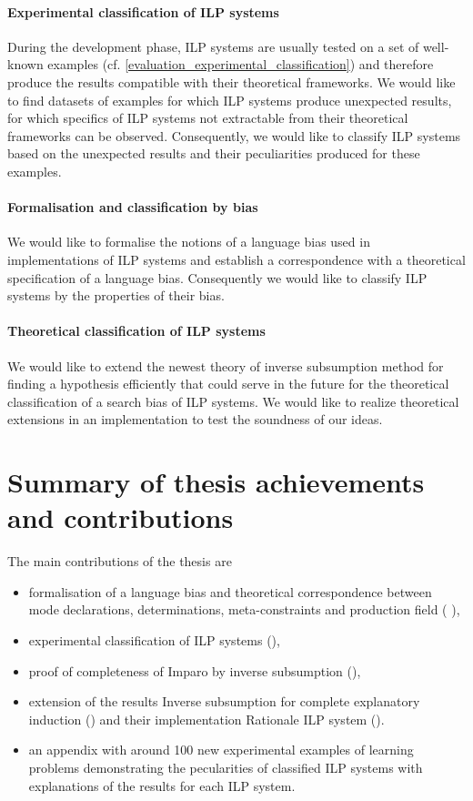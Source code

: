 \paragraph{Experimental classification of ILP systems}
During the development phase, ILP systems are usually tested on a set of well-known examples (cf. \ref{evaluation_experimental_classification}) and therefore produce the results compatible with their theoretical frameworks.
We would like to find datasets of examples for which ILP systems produce
unexpected results, for which specifics of ILP systems not extractable from their theoretical frameworks can be observed. Consequently, we would like to classify ILP systems based on the unexpected results and their peculiarities produced for these examples.
\paragraph{Formalisation and classification by bias}
We would like to formalise the notions of a language bias used in implementations of ILP systems and establish a correspondence with a theoretical specification of a language bias. Consequently we would like to classify ILP systems by the properties of their bias.
\paragraph{Theoretical classification of ILP systems}
We would like to extend the newest theory of inverse subsumption method for finding a hypothesis efficiently that could serve in the future for the theoretical classification of a search bias of ILP systems. We would like to realize theoretical extensions in an implementation to test the soundness of our ideas.

\section{Summary of thesis achievements and contributions}
The main contributions of the thesis are
\begin{itemize}
\item formalisation of a language bias and theoretical correspondence between mode declarations, determinations, meta-constraints and production field ( ),
\item experimental classification of ILP systems (),
\item proof of completeness of Imparo by inverse subsumption (),
\item extension of the results Inverse subsumption for complete explanatory induction () and their implementation Rationale ILP system ().
\item an appendix with around 100 new experimental examples of learning problems demonstrating the pecularities of classified ILP systems with explanations of the results for each ILP system.
\end{itemize}

